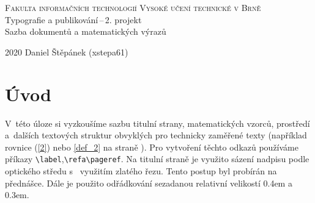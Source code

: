 \documentclass[11pt, titlepage, a4paper, twocolumn]{article}
\begin{document}
	\begin{titlepage}
		\begin{center}
			\Huge
			\textsc{Fakulta informačních technologií Vysoké učení technické v Brně}\\[0.4em]
	\LARGE{Typografie a publikování\,--\,2. projekt\\[0.3em]}
	Sazba dokumentů a matematických výrazů
	
		\end{center}

{\LARGE 2020 \hfill Daniel Štěpánek (xstepa61)}
	\end{titlepage}




\section*{Úvod}
V~této úloze si vyzkoušíme sazbu titulní strany, matematických vzorců, prostředí a~dalších textových struktur obvyklých pro technicky zaměřené texty (například rovnice (\ref{2}) nebo \ref{def_2} na straně \pageref{def_2}). Pro vytvoření těchto odkazů používáme příkazy \verb|\label|,\verb|\refa\pageref|. Na titulní straně je využito sázení nadpisu podle optického středu s~ využitím zlatého řezu. Tento postup byl probírán na přednášce. Dále je použito odřádkování sezadanou relativní velikostí 0.4em a 0.3em.
\end{document}

